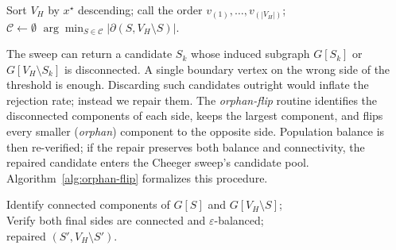 \documentclass[11pt]{article}
\begin{document}
\begin{algorithm}[H]
\caption{Cheeger-sweep rounding with orphan-flip repair}\label{alg:cheeger-sweep}
Sort $V_H$ by $x^\star$ descending; call the order $v_{(1)}, \ldots, v_{(|V_H|)}$;\\
$\mathcal{C} \gets \emptyset$ 
\Return $\arg\min_{S \in \mathcal{C}} |\partial(S, V_H \setminus S)|$.
\end{algorithm}

The sweep can return a candidate $S_k$ whose induced subgraph $G[S_k]$
or $G[V_H \setminus S_k]$ is disconnected. A single boundary vertex
on the wrong side of the threshold is enough. Discarding such
candidates outright would inflate the rejection rate; instead we repair
them. The \emph{orphan-flip} routine identifies the disconnected
components of each side, keeps the largest component, and flips every
smaller (\emph{orphan}) component to the opposite side. Population
balance is then re-verified; if the repair preserves both balance and
connectivity, the repaired candidate enters the Cheeger sweep's
candidate pool. Algorithm~\ref{alg:orphan-flip} formalizes this procedure.

\begin{algorithm}[H]
\caption{Orphan-flip repair}\label{alg:orphan-flip}
Identify connected components of $G[S]$ and $G[V_H \setminus S]$;\\
Verify both final sides are connected and $\varepsilon$-balanced;\\
\Return repaired $(S', V_H \setminus S')$.
\end{algorithm}
\end{document}
